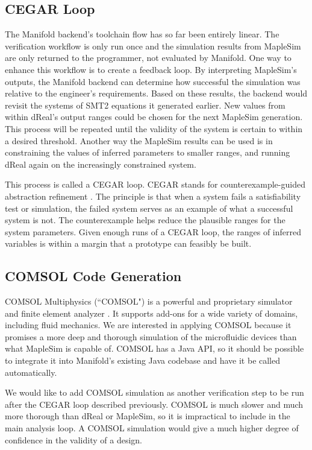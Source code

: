 \subsection{CEGAR Loop}

The Manifold backend's toolchain flow has so far been entirely linear.
The verification workflow is only run once and the simulation results from MapleSim are only returned
to the programmer, not evaluated by Manifold. One way to enhance this workflow is to create a feedback
loop.
By interpreting MapleSim's outputs, the Manifold backend can determine how successful the simulation was
relative to the engineer's requirements.
Based on these results, the backend would revisit the systems of SMT2 equations it generated earlier.
New values from within dReal's output ranges could be chosen for the next MapleSim generation.
This process will be repeated until the validity of the system is certain to within a desired threshold.
Another way the MapleSim results can be used is in constraining the values of inferred parameters to
smaller ranges, and running dReal again on the increasingly constrained system.

This process is called a CEGAR loop. CEGAR stands for counterexample-guided abstraction refinement \cite
{cegar}.
The principle is that when a system fails a satisfiability test or simulation, the failed system
serves as an example of what a successful system is not.
The counterexample helps reduce the plausible ranges for the system parameters.
Given enough runs of a CEGAR loop, the ranges of inferred variables is within a margin that a prototype
can feasibly be built.

\subsection{COMSOL Code Generation}

COMSOL Multiphysics (``COMSOL") \cite{comsol} is a powerful and proprietary simulator and finite element analyzer \cite{fem}.
It supports add-ons for a wide variety of domains, including fluid mechanics.
We are interested in applying COMSOL because it promises a more deep and thorough simulation of the microfluidic devices than what MapleSim is capable of.
COMSOL has a Java API, so it should be possible to integrate it into Manifold's existing Java codebase and have it be called automatically.

We would like to add COMSOL simulation as another verification step to be run after the CEGAR
loop described previously.
COMSOL is much slower and much more thorough than dReal or MapleSim, so it is impractical to include
in the main analysis loop. A COMSOL simulation would give a much higher degree of confidence in the
validity of a design.
